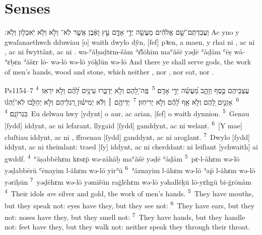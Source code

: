 \section{Senses}

\tounfold{***}

\begin{example}{5}{4}{28}{}{}
	\quoling
	{וַעֲבַדְתֶּם־שָׁ֣ם אֱלֹהִ֔ים מַעֲשֵׂ֖ה יְדֵ֣י אָדָ֑ם עֵ֣ץ וָאֶ֔בֶן אֲשֶׁ֤ר לֹֽא־ וְלֹ֣א  וְלֹ֥א יֹֽאכְל֖וּן וְלֹ֥א ׃}
	{Ac yno y gwaſanaethwch dduwiau [o] waith dwylo dŷn, [ſef] pꝛen, a maen, y rhai ni , ac ni , ac ni fwyttânt, ac ni .}
	{wa-ʿăḇaḏtɛm-šåm ʾɛ̆lōhīm maʿăśē yəḏē ʾåḏåm ʿēṣ wå-ʾɛḇɛn ʾăšɛr lō- wə-lō  wə-lō yōḵlūn wə-lō }
	{And there ye shall serve gods, the work of men’s hands, wood and stone, which neither , nor , nor eat, nor .}
\end{example}

\begin{example}{Ps}{115}{4–7}{}{}
	\quoling	
	{\textsuperscript{4}~עֲצַבֵּיהֶם כֶּ֣סֶף וְזָהָ֑ב מַ֝עֲשֵׂ֗ה יְדֵ֣י אָדָֽם׃
		\textsuperscript{5}~פֶּֽה־לָ֭הֶם וְלֹ֣א יְדַבֵּ֑רוּ עֵינַ֥יִם לָ֝הֶ֗ם וְלֹ֣א יִרְאֽוּ׃
		\textsuperscript{6}~אָזְנַ֣יִם לָ֭הֶם וְלֹ֣א  אַ֥ף לָ֝הֶ֗ם וְלֹ֣א יְרִיחֽוּן׃
		\textsuperscript{7}~יְדֵיהֶ֤ם ׀ וְלֹ֬א יְמִישׁ֗וּן רַ֭גְלֵיהֶם וְלֹ֣א יְהַלֵּ֑כוּ לֹֽא־יֶ֝הְגּ֗וּ בִּגְרוֹנָֽם׃}
	{\textsuperscript{4}~Eu delwau hwy [ydynt] o aur, ac arian, [ſef] o waith dynnion.
		\textsuperscript{5}~Genau [ſydd] iddynt, ac ni lefarant, llygaid [ſydd] ganddynt, ac ni welant.
		\textsuperscript{6}~[Y mae] cluſtiau iddynt, ac ni , ffroenau [ſydd] ganddynt, ac ni aroglant.
		\textsuperscript{7}~Dwylo [ſydd] iddynt, ac ni theimlant: traed [ſy] iddynt, ac ni cherddant: ni leiſiant [ychwaith] ai gwddf.}
	{\textsuperscript{4}~ʿăṣabbēhɛm kɛsɛp̄ wə-zåhåḇ maʿăśē yəḏē ʾåḏåm
		\textsuperscript{5}~pɛ-l-åhɛm wə-lō yəḏabbērū ʿēnayim l-åhɛm wə-lō yirʾū
		\textsuperscript{6}~ʾåznayim l-åhɛm wə-lō  ʾap̄ l-åhɛm wə-lō yərīḥūn
		\textsuperscript{7}~yəḏēhɛm wə-lō yəmīšūn raḡlēhɛm wə-lō yəhallēḵū lō-yɛhgū bi-ḡrōnåm}
	{\textsuperscript{4}~Their idols \emph{are} silver and gold, the work of men's hands.
		\textsuperscript{5}~They have mouths, but they speak not: eyes have they, but they see not:
		\textsuperscript{6}~They have ears, but they  not: noses have they, but they smell not:
		\textsuperscript{7}~They have hands, but they handle not: feet have they, but they walk not: neither speak they through their throat.}
\end{example}










